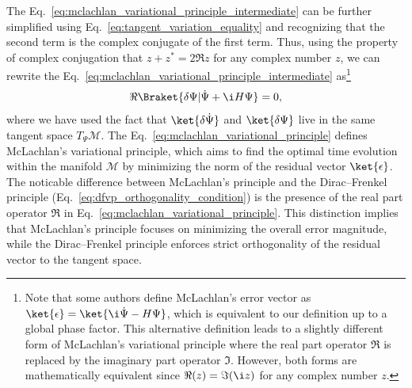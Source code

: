 The Eq.~\eqref{eq:mclachlan_variational_principle_intermediate} can be further simplified using Eq.~\eqref{eq:tangent_variation_equality} and recognizing that the second term is the complex conjugate of the first term. Thus, using the property of complex conjugation that $z+z^\ast=2\Re z$ for any complex number $z$, we can rewrite the Eq.~\eqref{eq:mclachlan_variational_principle_intermediate} as\footnote{Note that some authors define McLachlan's error vector as $\ket{\epsilon}=\ket{\i\dot\Psi-H\Psi}$, which is equivalent to our definition up to a global phase factor. This alternative definition leads to a slightly different form of McLachlan's variational principle where the real part operator $\Re$ is replaced by the imaginary part operator $\Im$. However, both forms are mathematically equivalent since $\Re(z)=\Im(\i z)$ for any complex number $z$.}
\begin{equation}\label{eq:mclachlan_variational_principle}
\Re\Braket{\delta\Psi|\dot\Psi+\i H\Psi}=0,
\end{equation}
where we have used the fact that $\ket{\delta\dot\Psi}$ and $\ket{\delta\Psi}$ live in the same tangent space $T_{\Psi}\mathcal{M}$. The Eq.~\eqref{eq:mclachlan_variational_principle} defines McLachlan's variational principle, which aims to find the optimal time evolution within the manifold $\mathcal{M}$ by minimizing the norm of the residual vector $\ket{\epsilon}$. The noticable difference between McLachlan's principle and the Dirac--Frenkel principle (Eq.~\eqref{eq:dfvp_orthogonality_condition}) is the presence of the real part operator $\Re$ in Eq.~\eqref{eq:mclachlan_variational_principle}. This distinction implies that McLachlan's principle focuses on minimizing the overall error magnitude, while the Dirac--Frenkel principle enforces strict orthogonality of the residual vector to the tangent space.

